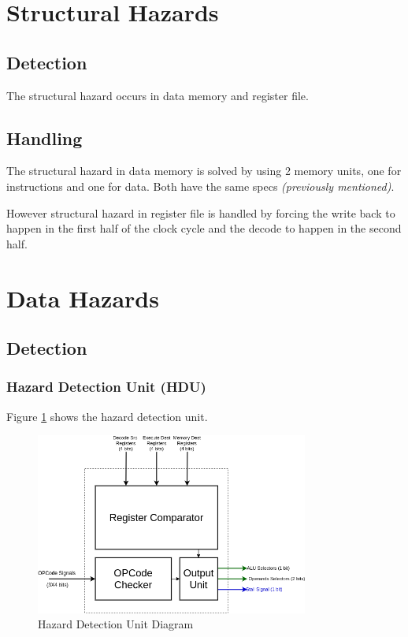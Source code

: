 
\section{Structural Hazards}

\subsection{Detection}
The structural hazard occurs in data memory and register file.

\subsection{Handling}
The structural hazard in data memory is solved by using 2 memory units, one for instructions and one for data. Both have the same specs \emph{(previously mentioned)}.

However structural hazard in register file is handled by forcing the write back to happen in the first half of the clock cycle and the decode to happen in the second half.

\section{Data Hazards}

\subsection{Detection}
\subsubsection{Hazard Detection Unit (HDU)}
Figure \ref{fig:hdu} shows the hazard detection unit.
\begin{figure}[hp]
    \centering
    \includegraphics[width=0.8\textwidth]{images/hdu}
    \caption{Hazard Detection Unit Diagram}
    \label{fig:hdu}
\end{figure}

